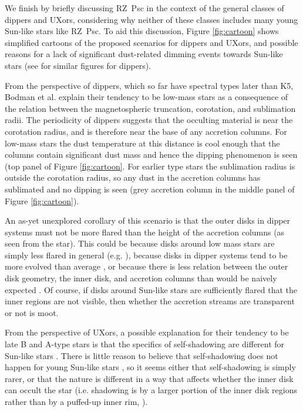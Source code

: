 \documentclass[]{rsos}
\begin{document}
We finish by briefly discussing RZ~Psc in the context of the general classes of dippers
and UXors, considering why neither of these classes includes many young Sun-like stars
like RZ~Psc. To aid this discussion, Figure \ref{fig:cartoon} shows simplified cartoons
of the proposed scenarios for dippers and UXors, and possible reasons for a lack of
significant dust-related dimming events towards Sun-like stars (see
\cite{2016arXiv160503985B} for similar figures for dippers).

From the perspective of dippers, which so far have spectral types later than K5, Bodman
et al.  \cite{2016arXiv160503985B} explain their tendency to be low-mass stars as a
consequence of the relation between the magnetospheric truncation, corotation, and
sublimation radii. The periodicity of dippers suggests that the occulting material is
near the corotation radius, and is therefore near the base of any accretion columns. For
low-mass stars the dust temperature at this distance is cool enough that the columns
contain significant dust mass and hence the dipping phenomenon is seen (top panel of
Figure \ref{fig:cartoon}. For earlier type stars the sublimation radius is outside the
corotation radius, so any dust in the accretion columns has sublimated and no dipping is
seen (grey accretion column in the middle panel of Figure \ref{fig:cartoon}).

An as-yet unexplored corollary of this scenario is that the outer disks in dipper systems
must not be more flared than the height of the accretion columns (as seen from the
star). This could be because disks around low mass stars are simply less flared in
general (e.g. \cite{2010ApJ...720.1668S}), because disks in dipper systems tend to be
more evolved than average \cite{2016ApJ...816...69A}, or because there is less relation
between the outer disk geometry, the inner disk, and accretion columns than would be
naively expected \cite{2016MNRAS.462L.101A}. Of course, if disks around Sun-like stars
are sufficiently flared that the inner regions are not visible, then whether the
accretion streams are transparent or not is moot.

From the perspective of UXors, a possible explanation for their tendency to be late B and
A-type stars is that the specifics of self-shadowing are different for Sun-like stars
\cite{2003ApJ...594L..47D}. There is little reason to believe that self-shadowing does
not happen for young Sun-like stars \cite{1987ApJ...323..714K,2004A&A...421.1075D}, so it
seems either that self-shadowing is simply rarer, or that the nature is different in a
way that affects whether the inner disk can occult the star (i.e. shadowing is by a
larger portion of the inner disk regions rather than by a puffed-up inner rim,
\cite{2004A&A...421.1075D,2007prpl.conf..555D}).
\end{document}
